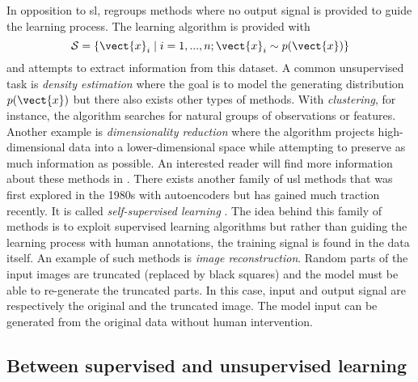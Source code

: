 In opposition to \acrlong{sl},  regroups methods where no output
signal is provided to guide the learning process. The learning algorithm is provided
with
\begin{equation}
\mathcal{S} = \left\{\vect{x}_i \mid i = 1,..., n ; \vect{x}_i \sim p(\vect{x})\right\}
\end{equation}
and attempts to extract information from this dataset. A common unsupervised task
is \textit{density estimation} where the goal is to model the generating distribution
$p(\vect{x})$ but there also exists other types of methods. With \textit{clustering},
for instance, the algorithm searches for natural groups of observations or features.
Another example is \textit{dimensionality reduction} where the algorithm projects
high-dimensional data into a lower-dimensional space while attempting to preserve
as much information as possible. An interested reader will find more information
about these methods in \parencite{friedman2017elements}. There exists another
family of \acrlong{usl} methods that was first explored in the 1980s with autoencoders
but has gained much traction recently. It is called \textit{self-supervised learning}
\parencite{lecun2021self}. The idea behind this family of methods is to exploit
supervised learning algorithms but rather than guiding the learning process with
human annotations, the training signal is found in the data itself. An example of
such methods is \textit{image reconstruction}. Random parts of the input images
are truncated (\eg replaced by black squares) and the model must be able to
re-generate the truncated parts. In this case, input and output signal are
respectively the original and the truncated image. The model input can be generated
from the original data without human intervention.

\subsection{Between supervised and unsupervised learning}
\label{ssec:backml:inbetween}

